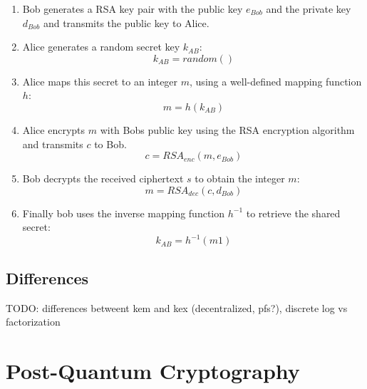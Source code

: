\begin{enumerate}
\item Bob generates a RSA key pair with the public key $e_{Bob}$ and the private key $d_{Bob}$ and transmits the public key to Alice.
\item Alice generates a random secret key $k_{AB}$:
\begin{equation*}
k_{AB} = random()
\end{equation*}
\item Alice maps this secret to an integer $m$, using a well-defined mapping function $h$:
\begin{equation*}
m = h(k_{AB})
\end{equation*}
\item Alice encrypts $m$ with Bobs public key using the RSA encryption algorithm and transmits $c$ to Bob.
\begin{equation*}
c = RSA_{enc}(m, e_{Bob})
\end{equation*}
\item Bob decrypts the received ciphertext $s$ to obtain the integer $m$:
\begin{equation*}
m = RSA_{dec}(c, d_{Bob})
\end{equation*}
\item Finally bob uses the inverse mapping function $h^{-1}$ to retrieve the shared secret:
\begin{equation*}
k_{AB} = h^{-1}(m1)
\end{equation*}

\end{enumerate}

\subsection{Differences}
TODO: differences betweent kem and kex (decentralized, pfs?), discrete log vs factorization

\section{Post-Quantum Cryptography}

